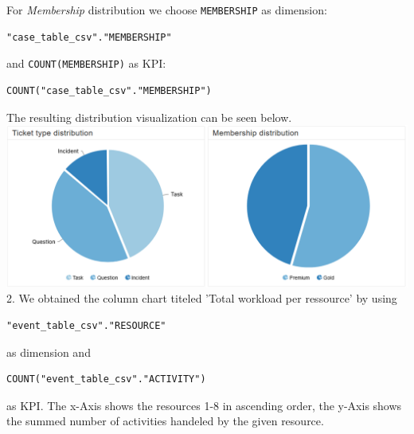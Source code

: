\documentclass[../../main.tex]{subfiles}
\begin{document}
For \textit{Membership} distribution we choose \texttt{MEMBERSHIP} as dimension:
\begin{verbatim}
"case_table_csv"."MEMBERSHIP"
\end{verbatim}
and \texttt{COUNT(MEMBERSHIP)} as KPI:
\begin{verbatim}
COUNT("case_table_csv"."MEMBERSHIP")
\end{verbatim}
The resulting distribution visualization can be seen below.\\
\includegraphics[width=\columnwidth]{img/Celonis_d_ticket_type_and_membership_distribution.png}\\

2. We obtained the column chart titeled 'Total workload per ressource' by using
\begin{verbatim}
"event_table_csv"."RESOURCE"
\end{verbatim}
as dimension and
\begin{verbatim}
COUNT("event_table_csv"."ACTIVITY")
\end{verbatim}
as KPI. The x-Axis shows the resources 1-8 in ascending order, the y-Axis shows the summed number of activities handeled by the given resource.
\end{document}
